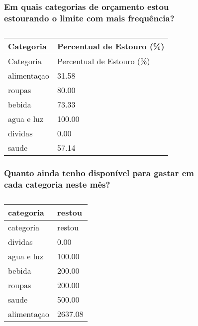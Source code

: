 \documentclass[
  8pt,
  a4paper,
  DIV=11,
  numbers=noendperiod]{scrartcl}
\begin{document}
\begin{figure}

\begin{minipage}{0.50\linewidth}

\subsubsection{Em quais categorias de orçamento estou estourando o
limite com mais
frequência?}\label{em-quais-categorias-de-oruxe7amento-estou-estourando-o-limite-com-mais-frequuxeancia}

\begin{longtable}[]{@{}ll@{}}
\caption{}\label{T_d3bc3}\tabularnewline
\toprule\noalign{}
Categoria & Percentual de Estouro (\%) \\
\midrule\noalign{}
\endfirsthead
\toprule\noalign{}
Categoria & Percentual de Estouro (\%) \\
\midrule\noalign{}
\endhead
\bottomrule\noalign{}
\endlastfoot
alimentaçao & 31.58 \\
roupas & 80.00 \\
bebida & 73.33 \\
agua e luz & 100.00 \\
dividas & 0.00 \\
saude & 57.14 \\
\end{longtable}

\end{minipage}%
%
\begin{minipage}{0.50\linewidth}

\subsubsection{Quanto ainda tenho disponível para gastar em cada
categoria neste
mês?}\label{quanto-ainda-tenho-disponuxedvel-para-gastar-em-cada-categoria-neste-muxeas}

\begin{longtable}[]{@{}ll@{}}
\caption{}\label{T_0158e}\tabularnewline
\toprule\noalign{}
categoria & restou \\
\midrule\noalign{}
\endfirsthead
\toprule\noalign{}
categoria & restou \\
\midrule\noalign{}
\endhead
\bottomrule\noalign{}
\endlastfoot
dividas & 0.00 \\
agua e luz & 100.00 \\
bebida & 200.00 \\
roupas & 200.00 \\
saude & 500.00 \\
alimentaçao & 2637.08 \\
\end{longtable}

\end{minipage}%

\end{figure}%
\end{document}
